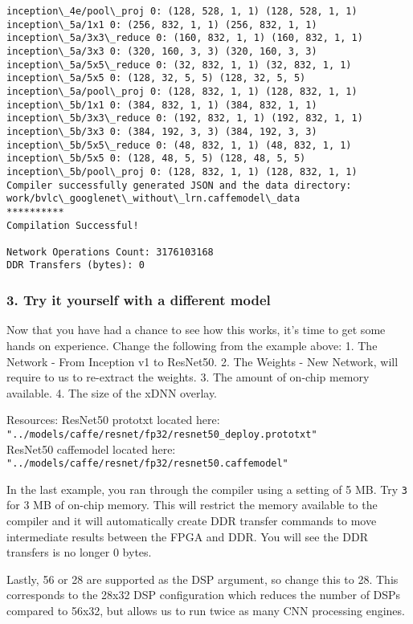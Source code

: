\documentclass[11pt]{article}
\begin{document}
\begin{Verbatim}[commandchars=\\\{\}]
inception\_4e/pool\_proj 0: (128, 528, 1, 1) (128, 528, 1, 1)
inception\_5a/1x1 0: (256, 832, 1, 1) (256, 832, 1, 1)
inception\_5a/3x3\_reduce 0: (160, 832, 1, 1) (160, 832, 1, 1)
inception\_5a/3x3 0: (320, 160, 3, 3) (320, 160, 3, 3)
inception\_5a/5x5\_reduce 0: (32, 832, 1, 1) (32, 832, 1, 1)
inception\_5a/5x5 0: (128, 32, 5, 5) (128, 32, 5, 5)
inception\_5a/pool\_proj 0: (128, 832, 1, 1) (128, 832, 1, 1)
inception\_5b/1x1 0: (384, 832, 1, 1) (384, 832, 1, 1)
inception\_5b/3x3\_reduce 0: (192, 832, 1, 1) (192, 832, 1, 1)
inception\_5b/3x3 0: (384, 192, 3, 3) (384, 192, 3, 3)
inception\_5b/5x5\_reduce 0: (48, 832, 1, 1) (48, 832, 1, 1)
inception\_5b/5x5 0: (128, 48, 5, 5) (128, 48, 5, 5)
inception\_5b/pool\_proj 0: (128, 832, 1, 1) (128, 832, 1, 1)
Compiler successfully generated JSON and the data directory: work/bvlc\_googlenet\_without\_lrn.caffemodel\_data
**********
Compilation Successful!

Network Operations Count: 3176103168
DDR Transfers (bytes): 0

    \end{Verbatim}

    \subsubsection{3. Try it yourself with a different
model}\label{try-it-yourself-with-a-different-model}

Now that you have had a chance to see how this works, it's time to get
some hands on experience. Change the following from the example above:
1. The Network - From Inception v1 to ResNet50. 2. The Weights - New
Network, will require to us to re-extract the weights. 3. The amount of
on-chip memory available. 4. The size of the xDNN overlay.

Resources: ResNet50 prototxt located here:
\texttt{"../models/caffe/resnet/fp32/resnet50\_deploy.prototxt"}\\
ResNet50 caffemodel located here:
\texttt{"../models/caffe/resnet/fp32/resnet50.caffemodel"}

In the last example, you ran through the compiler using a setting of 5
MB. Try \texttt{3} for 3 MB of on-chip memory. This will restrict the
memory available to the compiler and it will automatically create DDR
transfer commands to move intermediate results between the FPGA and DDR.
You will see the DDR transfers is no longer 0 bytes.

Lastly, 56 or 28 are supported as the DSP argument, so change this to
28. This corresponds to the 28x32 DSP configuration which reduces the
number of DSPs compared to 56x32, but allows us to run twice as many CNN
processing engines.
\end{document}
